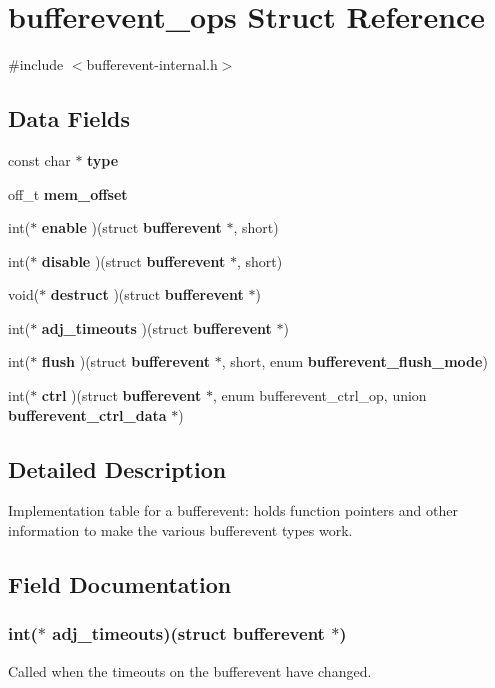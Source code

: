 \section{bufferevent\-\_\-ops \-Struct \-Reference}
\label{structbufferevent__ops}


{\ttfamily \#include $<$bufferevent-\/internal.\-h$>$}

\subsection*{\-Data \-Fields}
\begin{DoxyCompactItemize}
\item 
const char $\ast$ {\bf type}
\item 
off\-\_\-t {\bf mem\-\_\-offset}
\item 
int($\ast$ {\bf enable} )(struct {\bf bufferevent} $\ast$, short)
\item 
int($\ast$ {\bf disable} )(struct {\bf bufferevent} $\ast$, short)
\item 
void($\ast$ {\bf destruct} )(struct {\bf bufferevent} $\ast$)
\item 
int($\ast$ {\bf adj\-\_\-timeouts} )(struct {\bf bufferevent} $\ast$)
\item 
int($\ast$ {\bf flush} )(struct {\bf bufferevent} $\ast$, short, enum {\bf bufferevent\-\_\-flush\-\_\-mode})
\item 
int($\ast$ {\bf ctrl} )(struct {\bf bufferevent} $\ast$, enum bufferevent\-\_\-ctrl\-\_\-op, union {\bf bufferevent\-\_\-ctrl\-\_\-data} $\ast$)
\end{DoxyCompactItemize}


\subsection{\-Detailed \-Description}
\-Implementation table for a bufferevent\-: holds function pointers and other information to make the various bufferevent types work. 

\subsection{\-Field \-Documentation}
\subsubsection[{adj\-\_\-timeouts}]{\setlength{\rightskip}{0pt plus 5cm}int($\ast$ {\bf adj\-\_\-timeouts})(struct {\bf bufferevent} $\ast$)}\label{structbufferevent__ops_a421a8e68492c59c0cb7fdc2fa78908d6}
\-Called when the timeouts on the bufferevent have changed. 
